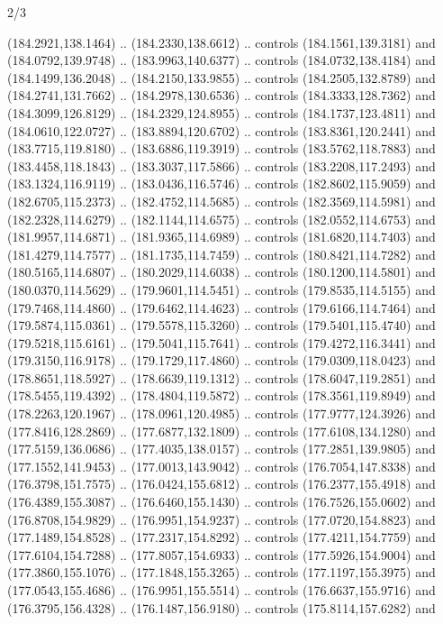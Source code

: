 \begin{flagdescription}{2/3}
\begin{scope}[shift={(0.5\flaglength,0.5)},scale=\flagwidth/320]
\begin{scope}[y=0.8pt, x=0.8pt, yscale=-1,shift={(-118.3,-146)}]
  (184.2921,138.1464) .. (184.2330,138.6612) .. controls (184.1561,139.3181) and
  (184.0792,139.9748) .. (183.9963,140.6377) .. controls (184.0732,138.4184) and
  (184.1499,136.2048) .. (184.2150,133.9855) .. controls (184.2505,132.8789) and
  (184.2741,131.7662) .. (184.2978,130.6536) .. controls (184.3333,128.7362) and
  (184.3099,126.8129) .. (184.2329,124.8955) .. controls (184.1737,123.4811) and
  (184.0610,122.0727) .. (183.8894,120.6702) .. controls (183.8361,120.2441) and
  (183.7715,119.8180) .. (183.6886,119.3919) .. controls (183.5762,118.7883) and
  (183.4458,118.1843) .. (183.3037,117.5866) .. controls (183.2208,117.2493) and
  (183.1324,116.9119) .. (183.0436,116.5746) .. controls (182.8602,115.9059) and
  (182.6705,115.2373) .. (182.4752,114.5685) .. controls (182.3569,114.5981) and
  (182.2328,114.6279) .. (182.1144,114.6575) .. controls (182.0552,114.6753) and
  (181.9957,114.6871) .. (181.9365,114.6989) .. controls (181.6820,114.7403) and
  (181.4279,114.7577) .. (181.1735,114.7459) .. controls (180.8421,114.7282) and
  (180.5165,114.6807) .. (180.2029,114.6038) .. controls (180.1200,114.5801) and
  (180.0370,114.5629) .. (179.9601,114.5451) .. controls (179.8535,114.5155) and
  (179.7468,114.4860) .. (179.6462,114.4623) .. controls (179.6166,114.7464) and
  (179.5874,115.0361) .. (179.5578,115.3260) .. controls (179.5401,115.4740) and
  (179.5218,115.6161) .. (179.5041,115.7641) .. controls (179.4272,116.3441) and
  (179.3150,116.9178) .. (179.1729,117.4860) .. controls (179.0309,118.0423) and
  (178.8651,118.5927) .. (178.6639,119.1312) .. controls (178.6047,119.2851) and
  (178.5455,119.4392) .. (178.4804,119.5872) .. controls (178.3561,119.8949) and
  (178.2263,120.1967) .. (178.0961,120.4985) .. controls (177.9777,124.3926) and
  (177.8416,128.2869) .. (177.6877,132.1809) .. controls (177.6108,134.1280) and
  (177.5159,136.0686) .. (177.4035,138.0157) .. controls (177.2851,139.9805) and
  (177.1552,141.9453) .. (177.0013,143.9042) .. controls (176.7054,147.8338) and
  (176.3798,151.7575) .. (176.0424,155.6812) .. controls (176.2377,155.4918) and
  (176.4389,155.3087) .. (176.6460,155.1430) .. controls (176.7526,155.0602) and
  (176.8708,154.9829) .. (176.9951,154.9237) .. controls (177.0720,154.8823) and
  (177.1489,154.8528) .. (177.2317,154.8292) .. controls (177.4211,154.7759) and
  (177.6104,154.7288) .. (177.8057,154.6933) .. controls (177.5926,154.9004) and
  (177.3860,155.1076) .. (177.1848,155.3265) .. controls (177.1197,155.3975) and
  (177.0543,155.4686) .. (176.9951,155.5514) .. controls (176.6637,155.9716) and
  (176.3795,156.4328) .. (176.1487,156.9180) .. controls (175.8114,157.6282) and

\end{scope}
\end{scope}
\end{flagdescription}
